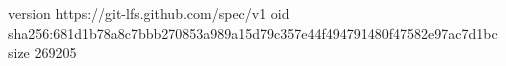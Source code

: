 version https://git-lfs.github.com/spec/v1
oid sha256:681d1b78a8c7bbb270853a989a15d79c357e44f494791480f47582e97ac7d1bc
size 269205
